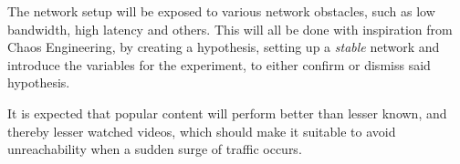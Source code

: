 The network setup will be exposed to various network obstacles, such as low bandwidth, high latency and others. This will all be done with inspiration from Chaos Engineering, by creating a hypothesis, setting up a \emph{stable} network and introduce the variables for the experiment, to either confirm or dismiss said hypothesis.


It is expected that popular content will perform better than lesser known, and thereby lesser watched videos, which should make it suitable to avoid unreachability when a sudden surge of traffic occurs.


